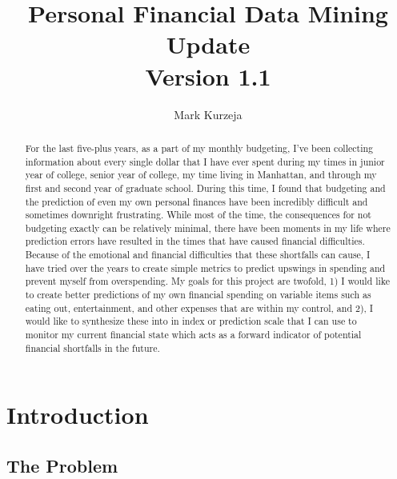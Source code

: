 \documentclass[11pt,a4paper]{article}
\title{Personal Financial Data Mining Update \\ {\small Version 1.1}}
\author{Mark Kurzeja}
\date{}
\begin{document}
\maketitle
\begin{abstract}


For the last five-plus years, as a part of my monthly budgeting, I've been collecting information about every single dollar that I have ever spent during my times in junior year of college, senior year of college, my time living in Manhattan, and through my first and second year of graduate school. During this time, I found that budgeting and the prediction of even my own personal finances have been incredibly difficult and sometimes downright frustrating. While most of the time, the consequences for not budgeting exactly can be relatively minimal, there have been moments in my life where prediction errors have resulted in the times that have caused financial difficulties. Because of the emotional and financial difficulties that these shortfalls can cause, I have tried over the years to create simple metrics to predict upswings in spending and prevent myself from overspending. My goals for this project are twofold, 1) I would like to create better predictions of my own financial spending on variable items such as eating out, entertainment, and other expenses that are within my control, and 2), I would like to synthesize these into in index or prediction scale that I can use to monitor my current financial state which acts as a forward indicator of potential financial shortfalls in the future.
  
\end{abstract}

\section{Introduction}

\subsection{The Problem}
\end{document}
